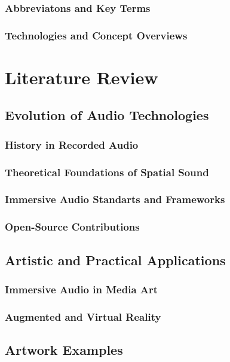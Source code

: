 \documentclass[a4paper, 12pt]{report}
\begin{document}
        \subsection{Abbreviatons and Key Terms}
        \subsection{Technologies and Concept Overviews}


\chapter{Literature Review}
    \section{Evolution of Audio Technologies}
        \subsection{History in Recorded Audio}
        \subsection{Theoretical Foundations of Spatial Sound}
        \subsection{Immersive Audio Standarts and Frameworks}
        \subsection{Open-Source Contributions}
    \section{Artistic and Practical Applications}
        \subsection{Immersive Audio in Media Art}
        \subsection{Augmented and Virtual Reality}
    \section{Artwork Examples}
\end{document}
